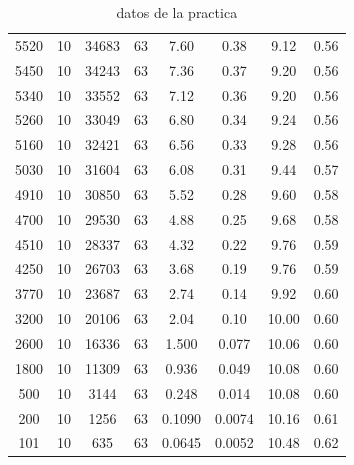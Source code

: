 \documentclass[12pt,a4paper]{article}
\begin{document}
\begin{table}[h!]
\begin{tabular}{|c|c|c|c|c|c|c|c|}
5520  & 10 &  34683 & 63 & 7.60 & 0.38 & 9.12 & 0.56 \\ 
5450  & 10 &  34243 & 63 & 7.36 & 0.37 & 9.20 & 0.56 \\ 
5340  & 10 &  33552 & 63 & 7.12 & 0.36 & 9.20 & 0.56 \\ 
5260  & 10 &  33049 & 63 & 6.80 & 0.34 & 9.24 & 0.56 \\ 
5160  & 10 &  32421 & 63 & 6.56 & 0.33 & 9.28 & 0.56 \\ 
5030  & 10 &  31604 & 63 & 6.08 & 0.31 & 9.44 & 0.57 \\ 
4910  & 10 &  30850 & 63 & 5.52 & 0.28 & 9.60 & 0.58 \\ 
4700  & 10 &  29530 & 63 & 4.88 & 0.25 & 9.68 & 0.58 \\ 
4510  & 10 &  28337 & 63 & 4.32 & 0.22 & 9.76 & 0.59 \\ 
4250  & 10 &  26703 & 63 & 3.68 & 0.19 & 9.76 & 0.59 \\ 
3770  & 10 &  23687 & 63 & 2.74 & 0.14 & 9.92 & 0.60 \\ 
3200  & 10 &  20106 & 63 & 2.04 & 0.10 & 10.00 & 0.60 \\ 
2600  & 10 &  16336 & 63 & 1.500 & 0.077 & 10.06 & 0.60 \\ 
1800  & 10 &  11309 & 63 & 0.936 & 0.049 & 10.08 & 0.60 \\ 
500  & 10 &  3144 & 63 & 0.248 & 0.014 & 10.08 & 0.60 \\ 
200  & 10 &  1256 & 63 & 0.1090 & 0.0074 & 10.16 & 0.61 \\ 
101  & 10 &  635 & 63 & 0.0645 & 0.0052 & 10.48 & 0.62 \\ 
\hline
\end{tabular} 
\caption{datos de la practica} 
\label{Tab:datos1} 
\end{table} 
 
\end{document}
